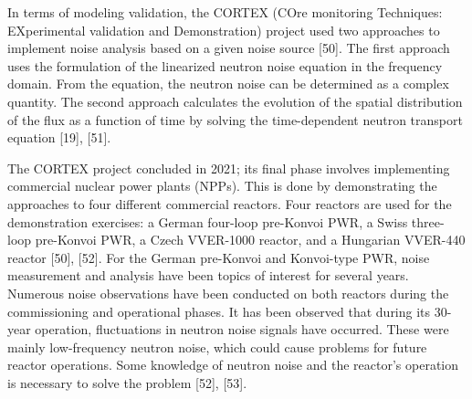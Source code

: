 In terms of modeling validation, the CORTEX (COre monitoring Techniques: EXperimental validation and Demonstration) project used two approaches to implement noise analysis based on a given noise source [50]. The first approach uses the formulation of the linearized neutron noise equation in the frequency domain. From the equation, the neutron noise can be determined as a complex quantity. The second approach calculates the evolution of the spatial distribution of the flux as a function of time by solving the time-dependent neutron transport equation [19], [51]. 

The CORTEX project concluded in 2021; its final phase involves implementing commercial nuclear power plants (NPPs). This is done by demonstrating the approaches to four different commercial reactors. Four reactors are used for the demonstration exercises: a German four-loop pre-Konvoi PWR, a Swiss three-loop pre-Konvoi PWR, a Czech VVER-1000 reactor, and a Hungarian VVER-440 reactor [50], [52]. For the German pre-Konvoi and Konvoi-type PWR, noise measurement and analysis have been topics of interest for several years. Numerous noise observations have been conducted on both reactors during the commissioning and operational phases. It has been observed that during its 30-year operation, fluctuations in neutron noise signals have occurred. These were mainly low-frequency neutron noise, which could cause problems for future reactor operations. Some knowledge of neutron noise and the reactor's operation is necessary to solve the problem [52], [53].
